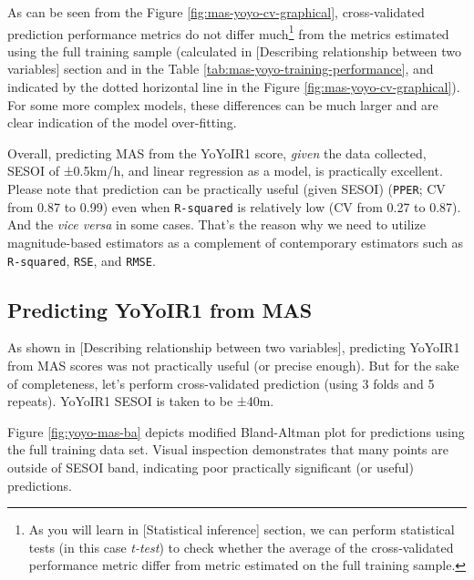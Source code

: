 \documentclass[
]{book}
\begin{document}
As can be seen from the Figure \ref{fig:mas-yoyo-cv-graphical}, cross-validated prediction performance metrics do not differ much\footnote{As you will learn in {[}Statistical inference{]} section, we can perform statistical tests (in this case \emph{t-test}) to check whether the average of the cross-validated performance metric differ from metric estimated on the full training sample.} from the metrics estimated using the full training sample (calculated in {[}Describing relationship between two variables{]} section and in the Table \ref{tab:mas-yoyo-training-performance}, and indicated by the dotted horizontal line in the Figure \ref{fig:mas-yoyo-cv-graphical}). For some more complex models, these differences can be much larger and are clear indication of the model over-fitting.

Overall, predicting MAS from the YoYoIR1 score, \emph{given} the data collected, SESOI of ±0.5km/h, and linear regression as a model, is practically excellent. Please note that prediction can be practically useful (given SESOI) (\texttt{PPER}; CV from 0.87 to 0.99) even when \texttt{R-squared} is relatively low (CV from 0.27 to 0.87). And the \emph{vice versa} in some cases. That's the reason why we need to utilize magnitude-based estimators as a complement of contemporary estimators such as \texttt{R-squared}, \texttt{RSE}, and \texttt{RMSE}.

\hypertarget{predicting-yoyoir1-from-mas}{%
\subsection{Predicting YoYoIR1 from MAS}\label{predicting-yoyoir1-from-mas}}

As shown in {[}Describing relationship between two variables{]}, predicting YoYoIR1 from MAS scores was not practically useful (or precise enough). But for the sake of completeness, let's perform cross-validated prediction (using 3 folds and 5 repeats). YoYoIR1 SESOI is taken to be ±40m.

Figure \ref{fig:yoyo-mas-ba} depicts modified Bland-Altman plot for predictions using the full training data set. Visual inspection demonstrates that many points are outside of SESOI band, indicating poor practically significant (or useful) predictions.
\end{document}
